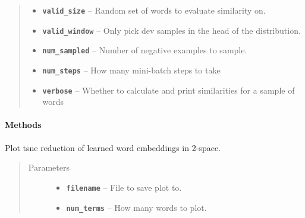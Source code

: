 \documentclass[letterpaper,10pt,english]{sphinxmanual}
\begin{document}
\begin{fulllineitems}
\begin{quote}
\begin{description}
\begin{itemize}
\item {} 
\textbf{\texttt{valid\_size}} -- Random set of words to evaluate similarity on.

\item {} 
\textbf{\texttt{valid\_window}} -- Only pick dev samples in the head of the distribution.

\item {} 
\textbf{\texttt{num\_sampled}} -- Number of negative examples to sample.

\item {} 
\textbf{\texttt{num\_steps}} -- How many mini-batch steps to take

\item {} 
\textbf{\texttt{verbose}} -- Whether to calculate and print similarities for a sample of words

\end{itemize}

\end{description}\end{quote}
\paragraph{Methods}

\begin{fulllineitems}
\label{models:skipgram.SkipGramVecs.plot_embeddings}
Plot tsne reduction of learned word embeddings in 2-space.
\begin{quote}\begin{description}
\item[{Parameters}] \leavevmode\begin{itemize}
\item {} 
\textbf{\texttt{filename}} -- File to save plot to.

\item {} 
\textbf{\texttt{num\_terms}} -- How many words to plot.

\end{itemize}

\end{description}\end{quote}

\end{fulllineitems}


\end{fulllineitems}
\end{document}
